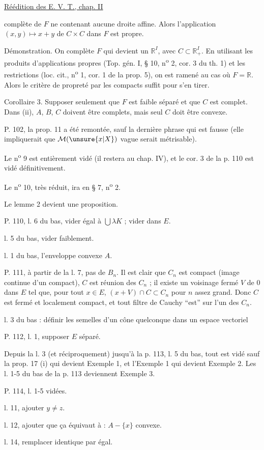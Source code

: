 \uline{Réédition des E. V. T., chap. II} 

complète de $F$ ne contenant aucune droite affine. Alors l'application $(x,y)\mapsto x+y$ de $C\times C$ dans $F$ est propre.

Démonstration. On complète $F$ qui devient un $\mathbb{R}^{I}$, avec $C\subset\mathbb{R}^{I}_{+}$. En utilisant les produits d'applications propres (Top. gén. I, § 10, n\textsuperscript{o} 2, cor. 3 du th. 1) et les restrictions (loc. cit., n\textsuperscript{o} 1, cor. 1 de la prop. 5), on est ramené au cas où $F=\mathbb{R}$. Alors le critère de propreté par les compacts suffit pour s'en tirer.

Corollaire 3. Supposer seulement que $F$ est faible séparé et que $C$ est complet. Dans (ii), $A$, $B$, $C$ doivent être complets, mais seul $C$ doit être convexe.

P. 102, la prop. 11 a été remontée, sauf la dernière phrase qui est fausse (elle impliquerait que $\mathcal{M}(\unsure{x|X})$ vague serait métrisable).

Le n\textsuperscript{o} 9 est entièrement vidé (il restera au chap. IV), et le cor. 3 de la p. 110 est vidé définitivement.

Le n\textsuperscript{o} 10, très réduit, ira en § 7, n\textsuperscript{o} 2.

Le lemme 2 devient une proposition.

P. 110, l. 6 du bas, vider égal à $\bigcup\lambda K$ ; vider dans $E$.

l. 5 du bas, vider faiblement.

l. 1 du bas, l'enveloppe convexe $A$.

P. 111, à partir de la l. 7, pas de $B_n$. Il est clair que $C_n$ est compact (image continue d'un compact), $C$ est réunion des $C_n$ ; il existe un voisinage fermé $V$ de $0$ dans $E$ tel que, pour tout $x\in E$, $(x+V)\cap C\subset C_n$ pour $n$ assez grand. Donc $C$ est fermé et localement compact, et tout filtre de Cauchy ``est'' sur l'un des $C_n$.

l. 3 du bas : définir les semelles d'un cône quelconque dans un espace vectoriel

P. 112, l. 1, supposer $E$ séparé.

Depuis la l. 3 (et réciproquement) jusqu'à la p. 113, l. 5 du bas, tout est vidé sauf la prop. 17 (i) qui devient Exemple 1, et l'Exemple 1 qui devient Exemple 2.
Les l. 1-5 du bas de la p. 113 deviennent Exemple 3.

P. 114, l. 1-5 vidées.

l. 11, ajouter $y\ne z$.

l. 12, ajouter que ça équivaut à : $A-\{x\}$ convexe.

l. 14, remplacer identique par égal.
